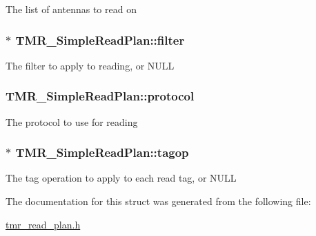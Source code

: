 The list of antennas to read on \hypertarget{struct_t_m_r___simple_read_plan_135d9dab041c7374db67782cd1f9534d}{
\subsubsection[{filter}]{$\ast$ {\bf TMR\_\-SimpleReadPlan::filter}}}
\label{struct_t_m_r___simple_read_plan_135d9dab041c7374db67782cd1f9534d}


The filter to apply to reading, or NULL \hypertarget{struct_t_m_r___simple_read_plan_4424d5594191b662906994722634e396}{
\subsubsection[{protocol}]{ {\bf TMR\_\-SimpleReadPlan::protocol}}}
\label{struct_t_m_r___simple_read_plan_4424d5594191b662906994722634e396}


The protocol to use for reading \hypertarget{struct_t_m_r___simple_read_plan_5991aff42b10948935a77b593b473016}{
\subsubsection[{tagop}]{$\ast$ {\bf TMR\_\-SimpleReadPlan::tagop}}}
\label{struct_t_m_r___simple_read_plan_5991aff42b10948935a77b593b473016}


The tag operation to apply to each read tag, or NULL 

The documentation for this struct was generated from the following file:\begin{CompactItemize}
\item 
\hyperlink{tmr__read__plan_8h}{tmr\_\-read\_\-plan.h}\end{CompactItemize}
